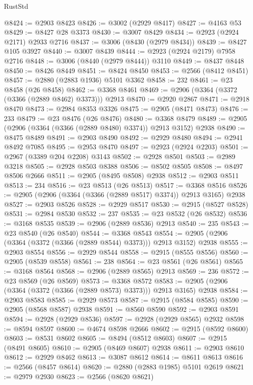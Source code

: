 \begin{lexlean}{RustStd}
\begin{coremodule}
@8424 := @2903 @8423
@8426 := @3002 (@2929 @8417)
@8427 := @4163 @53
@8429 := @8427 @28 @3373
@8430 := @3007 @8429
@8434 := @2923 (@2924 @2171) @2933 @2716
@8437 := @3006 (@8430 (@2979 @8434))
@8439 := @8427 @105 @3927
@8440 := @3007 @8439
@8444 := @2923 (@2924 @2179) @7958 @2716
@8448 := @3006 (@8440 (@2979 @8444)) @3110
@8449 := @8437 @8448
@8450 := @8426 @8449
@8451 := @8424 @8450
@8453 := @2566 (@8412 @8451)
@8457 := @2880 (@2883 @1936) @5101 @3362
@8458 := 232
@8461 := @23 @8458 (@26 @8458)
@8462 := @3368 @8461
@8469 := @2906 (@3364 (@3372 (@3366 (@2889 @8462) @3373))) @2913
@8470 := @2920 @2867
@8471 := @2918 @8470
@8473 := @2984 @8353 @3326
@8475 := @2905 (@8471 @8473)
@8476 := 233
@8479 := @23 @8476 (@26 @8476)
@8480 := @3368 @8479
@8489 := @2905 (@2906 (@3364 (@3366 (@2889 @8480) @3374)) @2913 @3152) @2938
@8490 := @8475 @8489
@8491 := @2903 @8490
@8492 := @2929 @8480
@8494 := @2941 @8492 @7085
@8495 := @2953 @8470
@8497 := @2923 (@2924 @2203)
@8501 := @2967 (@3389 @204 @2208) @3143
@8502 := @2928 @8501
@8503 := @2989 @3218
@8505 := @2928 @8503 @8388
@8506 := @8502 @8505
@8508 := @8497 @8506 @2666
@8511 := @2905 (@8495 @8508) @2938
@8512 := @2903 @8511
@8513 := 234
@8516 := @23 @8513 (@26 @8513)
@8517 := @3368 @8516
@8526 := @2905 (@2906 (@3364 (@3366 (@2889 @8517) @3374)) @2913 @3165) @2938
@8527 := @2903 @8526
@8528 := @2929 @8517
@8530 := @2915 (@8527 @8528)
@8531 := @2984 @8530
@8532 := 237
@8535 := @23 @8532 (@26 @8532)
@8536 := @3168 @8535
@8539 := @2906 (@2889 @8536) @2913
@8540 := 235
@8543 := @23 @8540 (@26 @8540)
@8544 := @3368 @8543
@8554 := @2905 (@2906 (@3364 (@3372 (@3366 (@2889 @8544) @3373))) @2913 @3152) @2938
@8555 := @2903 @8554
@8556 := @2929 @8544
@8558 := @2915 (@8555 @8556)
@8560 := @2905 (@8539 @8558)
@8561 := 238
@8564 := @23 @8561 (@26 @8561)
@8565 := @3168 @8564
@8568 := @2906 (@2889 @8565) @2913
@8569 := 236
@8572 := @23 @8569 (@26 @8569)
@8573 := @3368 @8572
@8583 := @2905 (@2906 (@3364 (@3372 (@3366 (@2889 @8573) @3373))) @2913 @3165) @2938
@8584 := @2903 @8583
@8585 := @2929 @8573
@8587 := @2915 (@8584 @8585)
@8590 := @2905 (@8568 @8587) @2938
@8591 := @8560 @8590
@8592 := @2903 @8591
@8594 := @2928 (@2929 @8536)
@8597 := @2928 (@2929 @8565) @2932
@8598 := @8594 @8597
@8600 := @4674 @8598 @2666
@8602 := @2915 (@8592 @8600)
@8603 := @8531 @8602
@8605 := @8494 (@8512 @8603)
@8607 := @2915 (@8491 @8605)
@8610 := @2905 (@8469 @8607) @2938
@8611 := @2903 @8610
@8612 := @2929 @8462
@8613 := @3087 @8612
@8614 := @8611 @8613
@8616 := @2566 (@8457 @8614)
@8620 := @2880 (@2883 @1985) @5101 @2619
@8621 := @2979 @2930
@8623 := @2566 (@8620 @8621)

\end{coremodule}
\end{lexlean}
